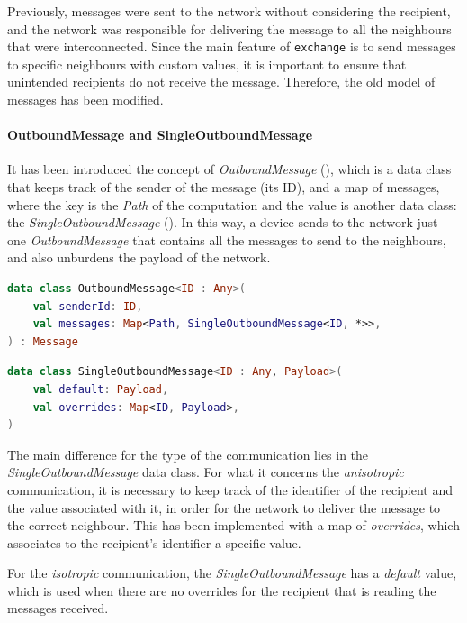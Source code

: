 Previously, messages were sent to the network without considering the recipient, and the network was responsible for
delivering the message to all the neighbours that were interconnected.
Since the main feature of \texttt{exchange} is to send messages to specific neighbours with custom values, it is important
to ensure that unintended recipients do not receive the message.
Therefore, the old model of messages has been modified.

\paragraph{OutboundMessage and SingleOutboundMessage}
It has been introduced the concept of \emph{OutboundMessage} (), which is a data class that keeps track of the sender of the
message (its ID), and a map of messages, where the key is the \emph{Path} of the computation and the value is another data
class: the \emph{SingleOutboundMessage} ().
In this way, a device sends to the network just one \emph{OutboundMessage} that contains all the messages to send to the neighbours,
and also unburdens the payload of the network.

\begin{lstlisting}[language=kt,label={lst:outbound}, caption={Outbound message data class.}]
data class OutboundMessage<ID : Any>(
    val senderId: ID,
    val messages: Map<Path, SingleOutboundMessage<ID, *>>,
) : Message
\end{lstlisting}

\begin{lstlisting}[language=kt,label={lst:single}, caption={Single outbound message data class.}]
data class SingleOutboundMessage<ID : Any, Payload>(
    val default: Payload,
    val overrides: Map<ID, Payload>,
)
\end{lstlisting}

The main difference for the type of the communication lies in the \emph{SingleOutboundMessage} data class.
For what it concerns the \emph{anisotropic} communication, it is necessary to keep track of the identifier of the recipient
and the value associated with it, in order for the network to deliver the message to the correct neighbour.
This has been implemented with a map of \emph{overrides}, which associates to the recipient's identifier a specific value.

For the \emph{isotropic} communication, the \emph{SingleOutboundMessage} has a \emph{default} value, which is used
when there are no overrides for the recipient that is reading the messages received.

